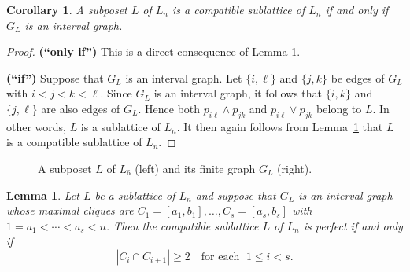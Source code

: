 \documentclass[12pt,a4paper]{amsart}
\newtheorem{Lemma}[Theorem]{Lemma}
\newtheorem{Corollary}[Theorem]{Corollary}
\theoremstyle{definition}
\begin{document}
\begin{Corollary}
    \label{distributive}    
    A subposet $L$ of $L_n$ is a compatible sublattice of $L_n$ if and only if $G_L$ is an interval graph. 
\end{Corollary}

\begin{proof}
{\bf (``only if'')} This is a direct consequence of Lemma \ref{distributive}. 

{\bf (``if'')} Suppose that \(G_L\) is an interval graph. Let \(\{i,\ell\}\) and \(\{j,k\}\) be edges of \(G_L\) with \(i<j<k<\ell\). Since \(G_L\) is an interval graph, it follows that \(\{i,k\}\) and \(\{j,\ell\}\) are also edges of \(G_L\). Hence both \(p_{i\ell} \wedge p_{jk}\) and \(p_{i\ell} \vee p_{jk}\) belong to \(L\). In other words, \(L\) is a sublattice of \(L_n\). It then again follows from Lemma~\ref{distributive} that \(L\) is a compatible sublattice of \(L_n\).
\end{proof}



\begin{figure}
    \centering
{}
    \caption{A subposet $L$ of $L_6$ (left) and its finite graph $G_{L}$ (right).}
    \label{fig: subposet_graph}
\end{figure}




\begin{Lemma}
    \label{LEMMAperfect}
    Let $L$ be a sublattice of $L_n$ and suppose that $G_L$ is an interval graph whose maximal cliques are $C_1 =[a_1, b_1], \ldots, C_s=[a_s, b_s]$ with $1=a_1 < \cdots < a_s < n$.  Then the compatible sublattice $L$ of $L_n$ is perfect if and only if 
    $$|C_i \cap C_{i+1}| \geq 2 \quad \text{for each } \; 1 \leq i < s.$$ 
\end{Lemma}
\end{document}
